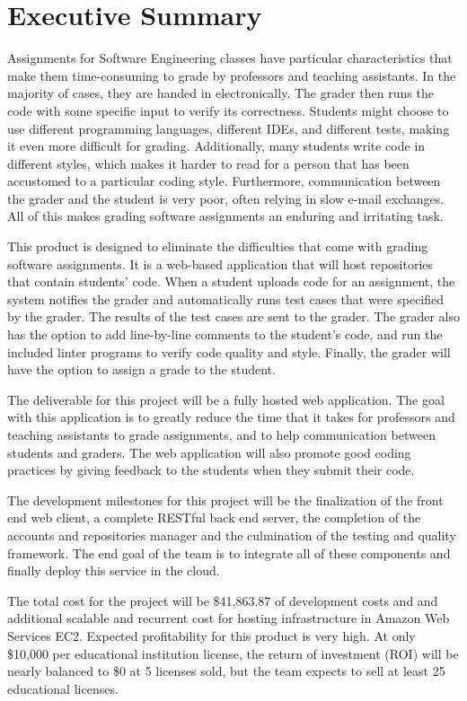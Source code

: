\part*{Executive Summary}

Assignments for Software Engineering classes have particular characteristics
that make them time-consuming to grade by professors and teaching assistants. In
the majority of cases, they are handed in electronically. The grader then
runs the code with some specific input to verify its correctness. Students might
choose to use different programming languages, different IDEs, and different
tests, making it even more difficult for grading. Additionally, many students
write code in different styles, which makes it harder to read for a person that
has been accustomed to a particular coding style. Furthermore, communication
between the grader and the student is very poor, often relying in slow e-mail
exchanges.  All of this makes grading software assignments an enduring and
irritating task.

This product is designed to eliminate the difficulties that come with grading
software assignments. It is a web-based application that will host
repositories that contain students' code. When a student uploads code for an
assignment, the system notifies the grader and automatically runs test cases
that were specified by the grader. The results of the test cases are sent to
the grader. The grader also has the option to add line-by-line comments to the
student's code, and run the included linter programs to verify code quality
and style. Finally, the grader will have the option to assign a grade to the
student.

The deliverable for this project will be a fully hosted web application. The
goal with this application is to greatly reduce the time that it takes for
professors and teaching assistants to grade assignments, and to help
communication between students and graders. The web application will also
promote good coding practices by giving feedback to the students when they
submit their code.

The development milestones for this project will be the finalization of the
front end web client, a complete RESTful back end server, the completion of
the accounts and repositories manager and the culmination of the testing and
quality framework. The end goal of the team is to integrate all of these
components and finally deploy this service in the cloud.


The total cost for the project will be \$41,863.87 of development costs and
and additional scalable and recurrent cost for hosting infrastructure in
Amazon Web Services EC2. Expected profitability for this product is very high.
At only \$10,000 per educational institution license, the return of investment
(ROI) will be nearly balanced to \$0 at 5 licenses sold, but the team expects
to sell at least 25 educational licenses.
